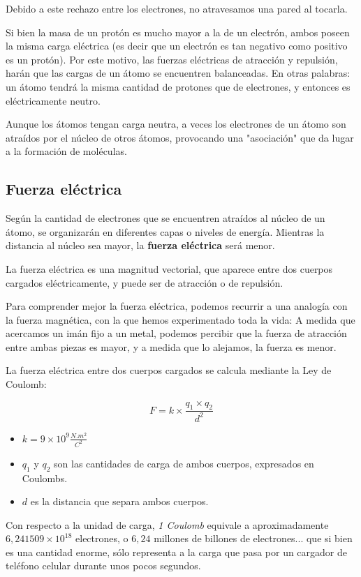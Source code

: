 Debido a este rechazo entre los electrones, no atravesamos una pared al tocarla.

Si bien la masa de un protón es mucho mayor a la de un electrón, ambos poseen la misma carga eléctrica (es decir que un electrón es tan negativo como positivo es un protón). Por este motivo, las fuerzas eléctricas de atracción y repulsión, harán que las cargas de un átomo se encuentren balanceadas. En otras palabras: un átomo tendrá la misma cantidad de protones que de electrones, y entonces es eléctricamente neutro.

Aunque los átomos tengan carga neutra, a veces los electrones de un átomo son atraídos por el núcleo de otros átomos, provocando una "asociación" que da lugar a la formación de moléculas.

\subsection{Fuerza eléctrica}

Según la cantidad de electrones que se encuentren atraídos al núcleo de un átomo, se organizarán en diferentes capas o niveles de energía. Mientras la distancia al núcleo sea mayor, la \textbf{fuerza eléctrica} será menor.

La fuerza eléctrica es una magnitud vectorial, que aparece entre dos cuerpos cargados eléctricamente, y puede ser de atracción o de repulsión.

Para comprender mejor la fuerza eléctrica, podemos recurrir a una analogía con la fuerza magnética, con la que hemos experimentado toda la vida: 
A medida que acercamos un imán fijo a un metal, podemos percibir que la fuerza de atracción entre ambas piezas es mayor, y a medida que lo alejamos, la fuerza es menor.

La fuerza eléctrica entre dos cuerpos cargados se calcula mediante la Ley de Coulomb:

$$ F = k \times \frac{q_1 \times q_2}{d^{2}} $$

\begin{itemize}
	\item $k=9 \times 10^{9}\frac{N.m^{2}}{C^{2}}$
	\item $q_1$ y $q_2$ son las cantidades de carga de ambos cuerpos, expresados en Coulombs.
	\item $d$ es la distancia que separa ambos cuerpos.
\end{itemize}

Con respecto a la unidad de carga, \textit{1 Coulomb} equivale a aproximadamente $6,241509\times 10^{18}$ electrones, o $6,24$ millones de billones de electrones... que si bien es una cantidad enorme, sólo representa a la carga que pasa por un cargador de teléfono celular durante unos pocos segundos.

